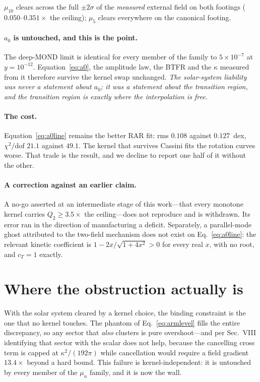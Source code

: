 \documentclass[aps,prd,twocolumn,superscriptaddress,nofootinbib,floatfix]{revtex4-2}
\begin{document}
$\mu_{10}$ clears across the full $\pm2\sigma$ of the \emph{measured} external field on both
footings ($0.050$--$0.351\times$ the ceiling); $\mu_5$ clears everywhere on the canonical footing.

\paragraph{$a_0$ is untouched, and this is the point.} The deep-MOND limit is identical for every
member of the family to $5\times10^{-7}$ at $y = 10^{-12}$. Equation~\eqref{eq:a0}, the amplitude
law, the BTFR and the $\kappa$ measured from it therefore survive the kernel swap unchanged.
\emph{The solar-system liability was never a statement about $a_0$; it was a statement about the
transition region, and the transition region is exactly where the interpolation is free.}

\paragraph{The cost.} Equation~\eqref{eq:a0line} remains the better RAR fit: rms $0.108$ against
$0.127$~dex, $\chi^2/\mathrm{dof}$ $21.1$ against $49.1$. The kernel that survives Cassini fits the
rotation curves worse. That trade is the result, and we decline to report one half of it without
the other.

\paragraph{A correction against an earlier claim.} A no-go asserted at an intermediate stage of this
work---that every monotone kernel carries $Q_2 \ge 3.5\times$ the ceiling---does not reproduce and
is withdrawn. Its error ran in the direction of manufacturing a deficit. Separately, a
parallel-mode ghost attributed to the two-field mechanism does not exist on
Eq.~\eqref{eq:a0line}: the relevant kinetic coefficient is $1-2x/\sqrt{1+4x^2} > 0$ for every real
$x$, with no root, and $c_T = 1$ exactly.

\section{Where the obstruction actually is}

With the solar system cleared by a kernel choice, the binding constraint is the one that no kernel
touches. The phantom of Eq.~\eqref{eq:armlevel} fills the entire discrepancy, so any sector that
\emph{also} clusters is pure overshoot---and per Sec.~VIII identifying that sector with the scalar
does not help, because the cancelling cross term is capped at $\kappa^2/(192\pi)$ while
cancellation would require a field gradient $13.4\times$ beyond a hard bound. This failure is
kernel-independent: it is untouched by every member of the $\mu_n$ family, and it is now the wall.
\end{document}
